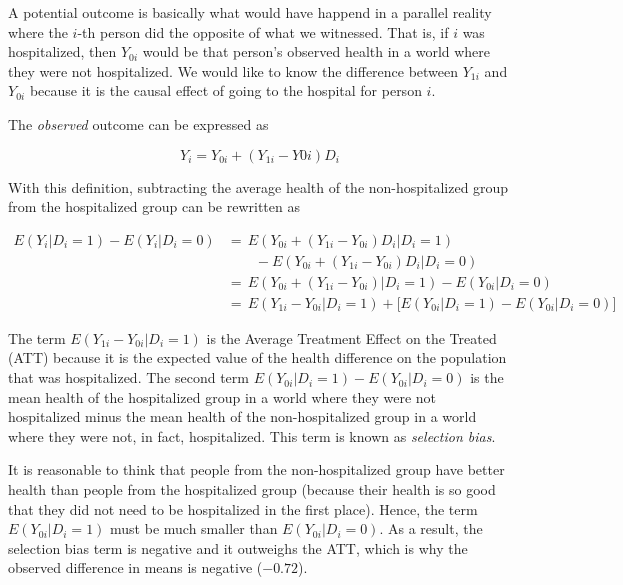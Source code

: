 \documentclass[12pt]{article}
\begin{document}
A potential outcome is basically what would have happend in a
parallel reality where the $i$-th person did the opposite of what we witnessed.
That is, if $i$ was hospitalized, then $Y_{0i}$ would be that person's observed
health in a world where they were not hospitalized. We would like to know the
difference between $Y_{1i}$ and $Y_{0i}$ because it is the causal effect of
going to the hospital for person $i$.

The \textit{observed} outcome can be expressed as

\begin{equation*}
    Y_i = Y_{0i} + (Y_{1i} - Y{0i}) D_i
\end{equation*}

With this definition, subtracting the average health of the non-hospitalized
group from the hospitalized group can be rewritten as

\begin{equation*}
    \begin{split}
        E(Y_i | D_i = 1) - E(Y_i | D_i = 0)
            & = \, E(Y_{0i} + (Y_{1i} - Y_{0i}) D_i | D_i = 1) \\
            & \qquad - E(Y_{0i} + (Y_{1i} - Y_{0i}) D_i | D_i = 0) \\
            & = \, E(Y_{0i} + (Y_{1i} - Y_{0i}) | D_i = 1)
                - E(Y_{0i} | D_i = 0) \\
            & = \, E(Y_{1i} - Y_{0i} | D_i = 1)
            + \big[ E(Y_{0i} | D_i = 1) - E(Y_{0i} | D_i = 0) \big]
    \end{split}
\end{equation*}

The term $E(Y_{1i} - Y_{0i} | D_i = 1)$ is the Average Treatment Effect on the
Treated (ATT) because it is the expected value of the health difference on the
population that was hospitalized. The second term
$E(Y_{0i} | D_i = 1) - E(Y_{0i} | D_i = 0)$ is the mean health of the
hospitalized group in a world where they were not hospitalized minus the mean
health of the non-hospitalized group in a world where they were not, in fact,
hospitalized. This term is known as \textit{selection bias}.

It is reasonable to think that people from the non-hospitalized group have
better health than people from the hospitalized group (because their health is
so good that they did not need to be hospitalized in the first place). Hence,
the term $E(Y_{0i} | D_i = 1)$ must be much smaller than $E(Y_{0i} | D_i = 0)$.
As a result, the selection bias term is negative and it outweighs the ATT,
which is why the observed difference in means is negative ($-0.72$).
\end{document}
